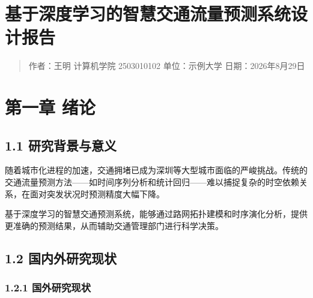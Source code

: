 \documentclass{harryopo-mathnotes}
\begin{document}
\maketitle
\thispagestyle{empty}
\cleardoublepage


\strictpagecheck
\setcounter{page}{1}
\restoregeometry
\onehalfspacing

\section{基于深度学习的智慧交通流量预测系统设计报告}\label{ux57faux4e8eux6df1ux5ea6ux5b66ux4e60ux7684ux667aux6167ux4ea4ux901aux6d41ux91cfux9884ux6d4bux7cfbux7edfux8bbeux8ba1ux62a5ux544a}

\begin{quote}
作者：王明 计算机学院 2503010102 单位：示例大学 日期：2026年8月29日
\end{quote}

\section{第一章 绪论}\label{ux7b2cux4e00ux7ae0-ux7eeaux8bba}

\subsection{1.1
研究背景与意义}\label{ux7814ux7a76ux80ccux666fux4e0eux610fux4e49}

随着城市化进程的加速，交通拥堵已成为深圳等大型城市面临的严峻挑战。传统的交通流量预测方法------如时间序列分析和统计回归------难以捕捉复杂的时空依赖关系，在面对突发状况时预测精度大幅下降。

基于深度学习的智慧交通预测系统，能够通过路网拓扑建模和时序演化分析，提供更准确的预测结果，从而辅助交通管理部门进行科学决策。

\subsection{1.2
国内外研究现状}\label{ux56fdux5185ux5916ux7814ux7a76ux73b0ux72b6}

\subsubsection{1.2.1
国外研究现状}\label{ux56fdux5916ux7814ux7a76ux73b0ux72b6}
\end{document}
